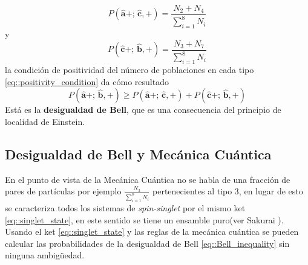 \documentclass[a4paper]{article}
\begin{document}
\begin{equation}
P(\mathbf{\hat{a}}+;\, \mathbf{\hat{c}},+) = \frac{N_2+N_4}{\sum_{i=1}^{8} N_i} 
\end{equation}
y
\begin{equation}
P(\mathbf{\hat{c}}+;\, \mathbf{\hat{b}},+) = \frac{N_3+N_7}{\sum_{i=1}^{8} N_i} 
\end{equation}
la condición de positividad del número de poblaciones en cada tipo \ref{eq::positivity_condition} da cómo resultado
\begin{equation}\label{eq::Bell_inequality}
P(\mathbf{\hat{a}}+;\, \mathbf{\hat{b}},+) \geq P(\mathbf{\hat{a}}+;\, \mathbf{\hat{c}},+) + P(\mathbf{\hat{c}}+;\, \mathbf{\hat{b}},+)  
\end{equation}
Está es la \textbf{desigualdad de Bell}, que es una consecuencia del principio de localidad de Einstein.

\subsection{Desigualdad de Bell y Mecánica Cuántica}
En el punto de vista de la Mecánica Cuántica no se habla de una fracción de pares de partículas por ejemplo $\frac{N_3}{\sum_{i=1}^{8} N_i}$ pertenecientes al tipo 3, en lugar de esto se caracteriza todos los sistemas de \textit{spin-singlet} por el mismo ket \ref{eq::singlet_state}, en este sentido se tiene un ensamble puro(ver Sakurai \cite{Sakurai}). Usando el ket \ref{eq::singlet_state} y las reglas de la mecánica cuántica se pueden calcular las probabilidades de la desigualdad de Bell \ref{eq::Bell_inequality} sin ninguna ambigüedad.\\
\end{document}

